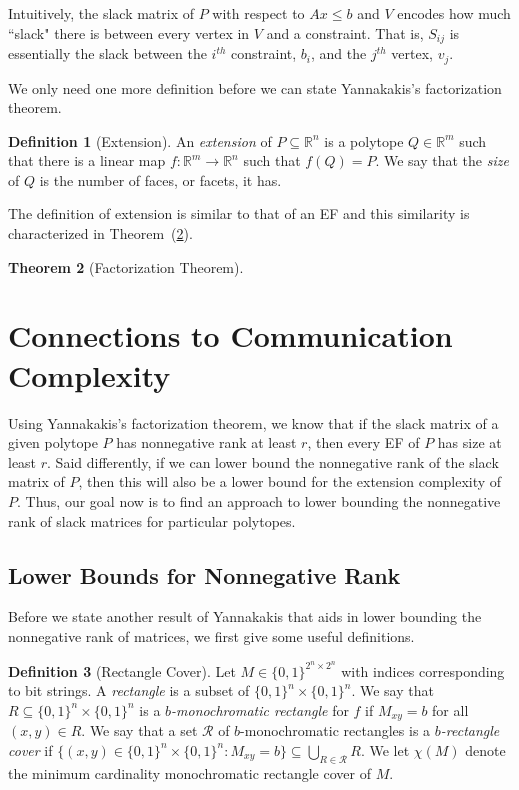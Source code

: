 \documentclass{article}
\newtheorem{theorem}{\sc Theorem}
\theoremstyle{definition}
\newtheorem{definition}[theorem]{Definition}
\theoremstyle{remark}
\newcommand{\bits}{\{0,1\}}
\renewcommand{\R}{\mathbb{R}}
\begin{document}
Intuitively, the slack matrix of $P$ with respect to $Ax \le b$ and $V$ encodes how much ``slack" there is between every vertex in $V$ and a constraint. That is, $S_{ij}$ is essentially the slack between the $i^{th}$ constraint, $b_i$, and the $j^{th}$ vertex, $v_j$.

We only need one more definition before we can state Yannakakis's factorization theorem. 

\begin{definition}[Extension]
An \emph{extension} of $P \subseteq \R^n$ is a polytope $Q \in \R^m$ such that there is a linear map $f : \R^m \to \R^n$ such that $f(Q) = P$. We say that the \emph{size} of $Q$ is the number of faces, or facets, it has.
\end{definition}

The definition of extension is similar to that of an EF and this similarity is characterized in Theorem~(\ref{theor:factor}).

\begin{theorem}[Factorization Theorem]\label{theor:factor}
\end{theorem}

\section{Connections to Communication Complexity}

Using Yannakakis's factorization theorem, we know that if the slack matrix of a given polytope $P$ has nonnegative rank at least $r$, then every EF of $P$ has size at least $r$. Said differently, if we can lower bound the nonnegative rank of the slack matrix of $P$, then this will also be a lower bound for the extension complexity of $P$. Thus, our goal now is to find an approach to lower bounding the nonnegative rank of slack matrices for particular polytopes. 

\subsection{Lower Bounds for Nonnegative Rank}\label{sec:theorem4}

Before we state another result of Yannakakis that aids in lower bounding the nonnegative rank of matrices, we first give some useful definitions.

\begin{definition}[Rectangle Cover]
Let $M \in \bits^{2^n \times 2^n}$ with indices corresponding to bit strings. A \emph{rectangle} is a subset of $\bits^n \times \bits^n$. We say that $R \subseteq \bits^n \times \bits^n$ is a \emph{$b$-monochromatic rectangle} for $f$ if $M_{xy} = b$ for all $(x,y) \in R$. We say that a set $\mathcal{R}$ of $b$-monochromatic rectangles is a \emph{$b$-rectangle cover} if $\{(x,y) \in \bits^n \times \bits^n : M_{xy} = b\} \subseteq \bigcup_{R \in \mathcal{R}} R$.  We let $\chi(M)$ denote the minimum cardinality monochromatic rectangle cover of $M$.
\end{definition}
\end{document}
